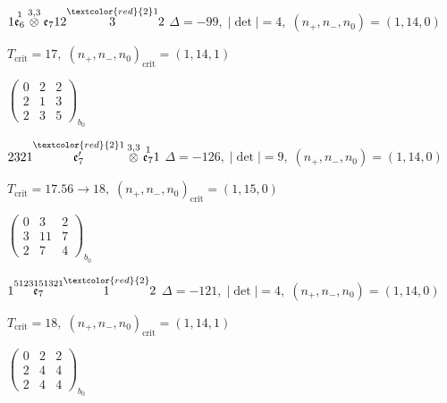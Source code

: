 \documentclass[10pt]{article}
\begin{document}
\smallskip

$1\overset{1}{\mathfrak{e}_6}\overset{3,3}{\otimes}\mathfrak{e}_712\overset{\textcolor{red}{2}1}{3}2$ \quad $\Delta=-99,\; |\det|=4,\; (n_+,n_-,n_0)=(1,14,0)$

\hspace{1em}$T_{\text{crit}}=17,\; (n_+,n_-,n_0)_{\text{crit}}=(1,14,1)$

\hspace{2em}$\left(\begin{smallmatrix}0 & 2 & 2 \\ 2 & 1 & 3 \\ 2 & 3 & 5\end{smallmatrix}\right)_{\!b_0}$

\smallskip

$2321\overset{\textcolor{red}{2}1}{\mathfrak{e}_7'}\overset{3,3}{\otimes}\overset{1}{\mathfrak{e}_7}1$ \quad $\Delta=-126,\; |\det|=9,\; (n_+,n_-,n_0)=(1,14,0)$

\hspace{1em}$T_{\text{crit}}=17.56 \to 18,\; (n_+,n_-,n_0)_{\text{crit}}=(1,15,0)$

\hspace{2em}$\left(\begin{smallmatrix}0 & 3 & 2 \\ 3 & 11 & 7 \\ 2 & 7 & 4\end{smallmatrix}\right)_{\!b_0}$

\smallskip

$1\overset{5123151321}{\mathfrak{e}_7}\overset{\textcolor{red}{2}}{1}2$ \quad $\Delta=-121,\; |\det|=4,\; (n_+,n_-,n_0)=(1,14,0)$

\hspace{1em}$T_{\text{crit}}=18,\; (n_+,n_-,n_0)_{\text{crit}}=(1,14,1)$

\hspace{2em}$\left(\begin{smallmatrix}0 & 2 & 2 \\ 2 & 4 & 4 \\ 2 & 4 & 4\end{smallmatrix}\right)_{\!b_0}$

\smallskip
\end{document}
